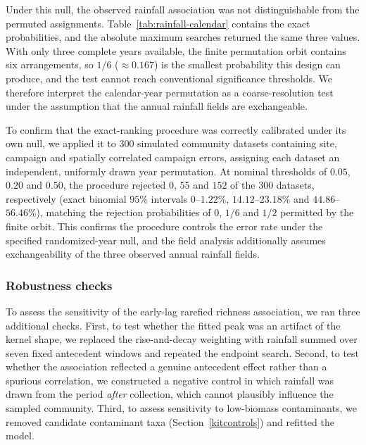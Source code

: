 \documentclass[11pt]{article}
\begin{document}
Under this null, the observed rainfall association was not distinguishable from the permuted assignments. Table~\ref{tab:rainfall-calendar} contains the exact probabilities, and the absolute maximum searches returned the same three values. With only three complete years available, the finite permutation orbit contains six arrangements, so $1/6$ ($\approx 0.167$) is the smallest probability this design can produce, and the test cannot reach conventional significance thresholds. We therefore interpret the calendar-year permutation as a coarse-resolution test under the assumption that the annual rainfall fields are exchangeable.

To confirm that the exact-ranking procedure was correctly calibrated under its own null, we applied it to $300$ simulated community datasets containing site, campaign and spatially correlated campaign errors, assigning each dataset an independent, uniformly drawn year permutation. At nominal thresholds of $0.05$, $0.20$ and $0.50$, the procedure rejected $0$, $55$ and $152$ of the $300$ datasets, respectively (exact binomial $95\%$ intervals $0$--$1.22\%$, $14.12$--$23.18\%$ and $44.86$--$56.46\%$), matching the rejection probabilities of $0$, $1/6$ and $1/2$ permitted by the finite orbit. This confirms the procedure controls the error rate under the specified randomized-year null, and the field analysis additionally assumes exchangeability of the three observed annual rainfall fields.

\subsubsection{Robustness checks}
To assess the sensitivity of the early-lag rarefied richness association, we ran three additional checks. First, to test whether the fitted peak was an artifact of the kernel shape, we replaced the rise-and-decay weighting with rainfall summed over seven fixed antecedent windows and repeated the endpoint search. Second, to test whether the association reflected a genuine antecedent effect rather than a spurious correlation, we constructed a negative control in which rainfall was drawn from the period \textit{after} collection, which cannot plausibly influence the sampled community. Third, to assess sensitivity to low-biomass contaminants, we removed candidate contaminant taxa (Section~\ref{kitcontrols}) and refitted the model.
\end{document}
